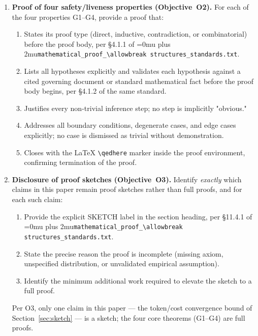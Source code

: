 \documentclass[12pt]{article}
\theoremstyle{definition}
\DeclareRobustCommand{\code}[1]{\begingroup\Urlmuskip=0mu plus 2mu\relax\nolinkurl{#1}\endgroup}
\newcommand{\ProofStd}{\code{mathematical\_proof\_\allowbreak structures\_standards.txt}}
\begin{document}
\begin{enumerate}
    \item \textbf{Proof of four safety/liveness properties (Objective~O2).}
          For each of the four properties G1--G4, provide a proof that:
          \begin{enumerate}
              \item[O2a.] States its proof type (direct, inductive,
                          contradiction, or combinatorial) before the proof
                          body, per \S4.1.1 of \ProofStd{}.
              \item[O2b.] Lists all hypotheses explicitly and validates
                          each hypothesis against a cited governing
                          document or standard mathematical fact before the
                          proof body begins, per \S4.1.2 of the same
                          standard.
              \item[O2c.] Justifies every non-trivial inference step;
                          no step is implicitly "obvious."
              \item[O2d.] Addresses all boundary conditions, degenerate
                          cases, and edge cases explicitly; no case is
                          dismissed as trivial without demonstration.
              \item[O2e.] Closes with the \LaTeX{} \verb|\qedhere| marker
                          inside the proof environment, confirming
                          termination of the proof.
          \end{enumerate}

    \item \textbf{Disclosure of proof sketches (Objective~O3).}
          Identify \emph{exactly} which claims in this paper remain proof
          sketches rather than full proofs, and for each such claim:
          \begin{enumerate}
              \item[O3a.] Provide the explicit SKETCH label in the
                          section heading, per \S11.4.1 of \ProofStd{}.
              \item[O3b.] State the precise reason the proof is
                          incomplete (missing axiom, unspecified
                          distribution, or unvalidated empirical
                          assumption).
              \item[O3c.] Identify the minimum additional work required
                          to elevate the sketch to a full proof.
          \end{enumerate}
          Per O3, only one claim in this paper --- the token/cost
          convergence bound of Section~\ref{sec:sketch} --- is a sketch;
          the four core theorems (G1--G4) are full proofs.


\end{enumerate}
\end{document}
